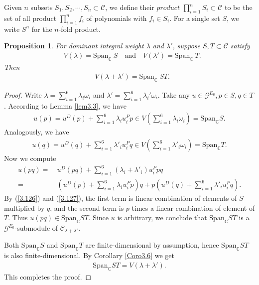 \documentclass[12pt]{article}
\numberwithin{equation}{section}
\newtheorem{proposition}[theorem]{Proposition}
\theoremstyle{definition}
\theoremstyle{remark}
\begin{document}
Given $n$ subsets $S_1,S_2,\cdots,S_n\subset\mathscr{C}$, we define their $product$ $\prod_{i=1}^nS_i\subset\mathscr{C}$ to be the set of all product $\prod_{i=1}^nf_i$ of polynomials with $f_i\in S_i$. For a single set $S$, we write $S^n$ for the $n$-fold product.
\begin{proposition}\label{prop3.6}
	For dominant integral weight $\lambda$ and $\lambda'$, suppose $S,T\subset\mathscr{C}$ satisfy\begin{eqnarray}
		&V(\lambda)=\mathrm{Span}_{\mathbb{C}}\:S\quad\text{and} \quad V(\lambda')=\mathrm{Span}_{\mathbb{C}}\:T.
	\end{eqnarray} 
	Then
	\begin{eqnarray}
		&V(\lambda+\lambda')=\mathrm{Span}_{\mathbb{C}}\:ST.
	\end{eqnarray}
\end{proposition}
\begin{proof}
	Write $\lambda=\sum_{i=1}^6\lambda_i\omega_i$ and $\lambda'=\sum_{i=1}^6\lambda_i'\omega_i$. Take any $u\in\mathscr{G}^{E_6},p\in S, q\in T$. According to Lemma \ref{lem3.3}, we have
	\begin{eqnarray}
		u(p)=u^D(p)+\mathop{\textstyle\sum}\limits_{i=1}^6\lambda_iu^P_ip\in V(\mathop{\textstyle\sum}\limits_{i=1}^6\lambda_i\omega_i)=\mathrm{Span}_{\mathbb{C}}S.\label{3.126}
	\end{eqnarray}
	Analogously, we have
	\begin{eqnarray}
		u(q)=u^D(q)+\mathop{\textstyle\sum}\limits_{i=1}^6\lambda'_iu^P_iq\in V(\mathop{\textstyle\sum}\limits_{i=1}^6\lambda'_i\omega_i)=\mathrm{Span}_{\mathbb{C}}T.\label{3.127}
	\end{eqnarray}
	Now we compute
	\begin{align}
		u(pq)=&\:u^{D}(pq)+\mathop{\textstyle\sum}\limits_{i=1}^6(\lambda_i+\lambda'_i)u^P_ipq\nonumber\\
		=&\:(u^D(p)+\mathop{\textstyle\sum}\limits_{i=1}^6\lambda_iu^P_ip)q+p(u^D(q)+\mathop{\textstyle\sum}\limits_{i=1}^6\lambda'_iu^P_iq).
	\end{align}
	By (\ref{3.126}) and (\ref{3.127}), the first term is linear combination of elements of $S$ multiplied by $q$, and the second term is $p$ times a linear combination of element of $T$. Thus $u(pq)\in\mathrm{Span}_{\mathbb{C}}ST$. Since $u$ is arbitrary, we conclude that $\mathrm{Span}_{\mathbb{C}}ST$ is a $\mathscr{G}^{E_6}$-submodule of $\mathscr{C}_{\lambda+\lambda'}$.
	
	Both $\mathrm{Span}_{\mathbb{C}}S$ and $\mathrm{Span}_{\mathbb{C}}T$ are finite-dimensional by assumption, hence $\mathrm{Span}_{\mathbb{C}}ST$ is also finite-dimensional. By Corollary \ref{Coro3.6} we get
	\begin{eqnarray}
		\mathrm{Span}_{\mathbb{C}}ST=V(\lambda+\lambda').
	\end{eqnarray}
	This completes the proof. 
\end{proof}
\end{document}
